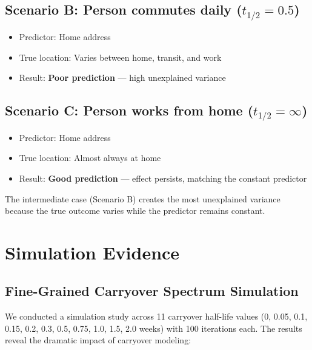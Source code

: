\documentclass[11pt,a4paper]{article}
\begin{document}
\subsection{Scenario B: Person commutes daily ($t_{1/2} = 0.5$)}
\begin{itemize}
    \item Predictor: Home address
    \item True location: Varies between home, transit, and work
    \item Result: \textbf{Poor prediction} --- high unexplained variance
\end{itemize}

\subsection{Scenario C: Person works from home ($t_{1/2} = \infty$)}
\begin{itemize}
    \item Predictor: Home address
    \item True location: Almost always at home
    \item Result: \textbf{Good prediction} --- effect persists, matching the constant predictor
\end{itemize}

The intermediate case (Scenario B) creates the most unexplained variance
because the true outcome varies while the predictor remains constant.

\section{Simulation Evidence}

\subsection{Fine-Grained Carryover Spectrum Simulation}

We conducted a simulation study across 11 carryover half-life values
(0, 0.05, 0.1, 0.15, 0.2, 0.3, 0.5, 0.75, 1.0, 1.5, 2.0 weeks) with 100
iterations each. The results reveal the dramatic impact of carryover modeling:
\end{document}
